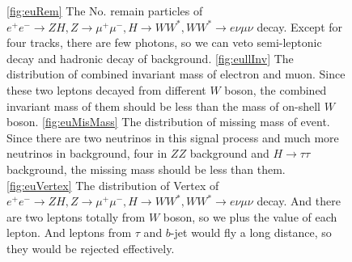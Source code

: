 \documentclass[11pt,a4paper]{cepcnote}
\begin{document}
\begin{figure}[H]
\centering
	\caption[]{
		\ref{fig:euRem} The No. remain particles of $e^+e^-\rightarrow ZH, Z\rightarrow\mu^+\mu^-, H\rightarrow WW^*,  
		WW^*\rightarrow e\nu\mu\nu$ decay. Except for four tracks, there are few photons, so we can veto semi-leptonic decay
		and hadronic decay of background.
		\ref{fig:eullInv} The distribution of combined invariant mass of electron and muon. 
		Since these two leptons decayed from different $W$ boson, the combined invariant mass of them 
		should be less than the mass of on-shell $W$ boson.
		\ref{fig:euMisMass} The distribution of missing mass of event. Since there are two neutrinos in this signal process 
		and much more neutrinos in background, four in $ZZ$ background and $H\to\tau\tau$ background, the missing mass should 
		be less than them.
		\ref{fig:euVertex} The distribution of Vertex of $e^+e^-\rightarrow ZH, Z\rightarrow\mu^+\mu^-, H\rightarrow WW^*, 
		WW^*\rightarrow e\nu\mu\nu$ decay. And there are two leptons totally from $W$ boson, so we plus the value of each lepton.
		And leptons from $\tau$ and $b$-jet would fly a long distance, so they would be rejected effectively.}
	\label{fig:euRemandVertex}
\end{figure}
\end{document}
